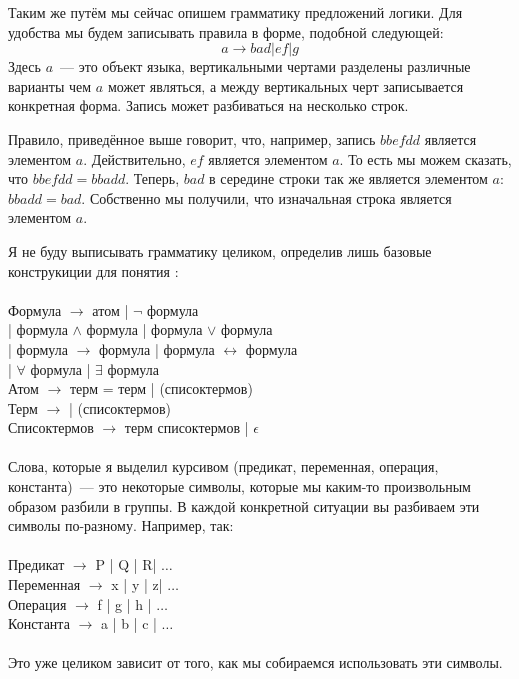 Таким же путём мы сейчас опишем грамматику предложений логики. Для удобства мы будем записывать правила в форме, подобной следующей:
$$a \to bad | ef | g$$
Здесь $a$~--- это объект языка, вертикальными чертами разделены различные варианты чем $a$ может являться, а между вертикальных черт записывается конкретная форма. Запись может разбиваться на несколько строк.

\begin{example}
Правило, приведённое выше говорит, что, например, запись  $bbefdd$ является элементом $a$. Действительно, $ef$ является элементом $a$. То есть мы можем сказать, что $bbefdd = bbadd$. Теперь, $bad$ в середине строки так же является элементом $a$: $bbadd = bad$. Собственно мы получили, что изначальная строка является элементом $a$.
\end{example}

Я не буду выписывать грамматику целиком, определив лишь базовые конструкиции для понятия :\\
\\
Формула $\to$ атом | $\neg$ формула\\
\hspace*{2cm}| формула $\land$ формула | формула $\lor$ формула\\
\hspace*{2cm}| формула $\to$ формула | формула $\leftrightarrow$ формула\\
\hspace*{2cm}| $\forall$  формула | $\exists$  формула\\
Атом $\to$ терм = терм |  (списоктермов)\\
Терм $\to$  |  (списоктермов)\\
Списоктермов $\to$ терм списоктермов | $\epsilon$\\
\\
Слова, которые я выделил курсивом (предикат, переменная, операция, константа)~--- это некоторые символы, которые мы каким-то произвольным образом разбили в группы. В каждой конкретной ситуации вы разбиваем эти символы по-разному. Например, так:\\
\\
Предикат $\to$ P | Q | R| $\ldots$\\
Переменная $\to$ x | y | z| $\ldots$\\
Операция $\to$ f | g | h | $\ldots$\\
Константа $\to$ a | b | c | $\ldots$\\
\\
Это уже целиком зависит от того, как мы собираемся использовать эти символы.

